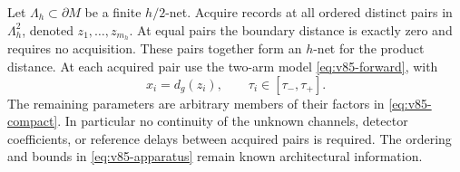 Let $\Lambda_h\subset\partial M$ be a finite $h/2$-net. Acquire
records at all ordered distinct pairs in $\Lambda_h^2$, denoted
$z_1,\ldots,z_{m_h}$. At equal pairs the boundary distance is exactly
zero and requires no acquisition. These pairs together form an $h$-net
for the product distance. At each acquired pair use the two-arm model
\eqref{eq:v85-forward}, with
\begin{equation}\label{eq:v85-geometric-arms}
                x_i=d_g(z_i),\qquad \tau_i\in[\tau_-,\tau_+].
\end{equation}
The remaining parameters are arbitrary members of their factors in
\eqref{eq:v85-compact}. In particular no continuity of the unknown
channels, detector coefficients, or reference delays between acquired
pairs is required. The ordering and bounds in
\eqref{eq:v85-apparatus} remain known architectural information.

